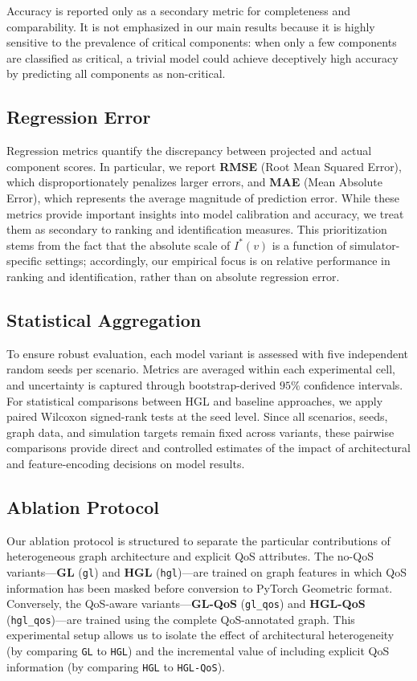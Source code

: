 \documentclass[sigconf,9pt,anonymous]{acmart}
\begin{document}
Accuracy is reported only as a secondary metric for completeness and comparability. It is not emphasized in our main results because it is highly sensitive to the prevalence of critical components: when only a few components are classified as critical, a trivial model could achieve deceptively high accuracy by predicting all components as non-critical.

\subsection{Regression Error}

Regression metrics quantify the discrepancy between projected and actual component scores. In particular, we report \textbf{RMSE} (Root Mean Squared Error), which disproportionately penalizes larger errors, and \textbf{MAE} (Mean Absolute Error), which represents the average magnitude of prediction error. While these metrics provide important insights into model calibration and accuracy, we treat them as secondary to ranking and identification measures. This prioritization stems from the fact that the absolute scale of $I^*(v)$ is a function of simulator-specific settings; accordingly, our empirical focus is on relative performance in ranking and identification, rather than on absolute regression error.

\subsection{Statistical Aggregation}

To ensure robust evaluation, each model variant is assessed with five independent random seeds per scenario. Metrics are averaged within each experimental cell, and uncertainty is captured through bootstrap-derived $95\%$ confidence intervals. For statistical comparisons between HGL and baseline approaches, we apply paired Wilcoxon signed-rank tests at the seed level. Since all scenarios, seeds, graph data, and simulation targets remain fixed across variants, these pairwise comparisons provide direct and controlled estimates of the impact of architectural and feature-encoding decisions on model results.

\subsection{Ablation Protocol}

Our ablation protocol is structured to separate the particular contributions of heterogeneous graph architecture and explicit QoS attributes. The no-QoS variants—\textbf{GL} (\texttt{gl}) and \textbf{HGL} (\texttt{hgl})—are trained on graph features in which QoS information has been masked before conversion to PyTorch Geometric format. Conversely, the QoS-aware variants—\textbf{GL-QoS} (\texttt{gl\_qos}) and \textbf{HGL-QoS} (\texttt{hgl\_qos})—are trained using the complete QoS-annotated graph. This experimental setup allows us to isolate the effect of architectural heterogeneity (by comparing \texttt{GL} to \texttt{HGL}) and the incremental value of including explicit QoS information (by comparing \texttt{HGL} to \texttt{HGL-QoS}).
\end{document}
